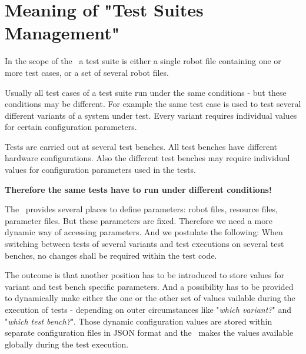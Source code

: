 %



%

\section{Meaning of "Test Suites Management"}

In the scope of the \rfwcore\ a test suite is either a single robot file containing one or more test cases, or a set of several robot files.

Usually all test cases of a test suite run under the same conditions - but these conditions may be different. For example the same test case is used
to test several different variants of a system under test. Every variant requires individual values for certain configuration parameters.

Tests are carried out at several test benches. All test benches have different hardware configurations.
Also the different test benches may require individual values for configuration parameters used in the tests.

\textbf{Therefore the same tests have to run under different conditions!}

The \rfwcore\ provides several places to define parameters: robot files, resource files, parameter files. But these parameters
are fixed. Therefore we need a more dynamic way of accessing parameters. And we postulate the following: When switching between
tests of several variants and test executions on several test benches, no changes shall be required within the test code.

The outcome is that another position has to be introduced to store values for variant and test bench specific parameters.
And a possibility has to be provided to dynamically make either the one or the other set of values vailable during the execution of
tests - depending on outer circumstances like "\textit{which variant?}" and "\textit{which test bench?}".
Those dynamic configuration values are stored within separate configuration files in JSON format and the \pkg\ makes the values 
available globally during the test execution.

